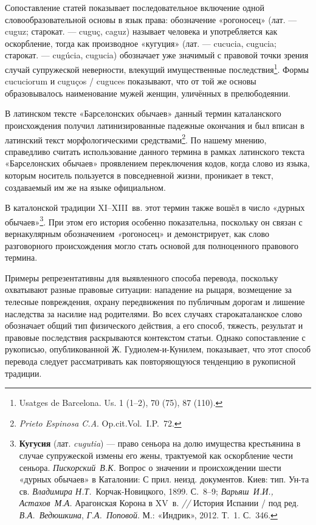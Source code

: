 Сопоставление статей показывает последовательное включение одной словообразовательной основы в язык права: обозначение «рогоносец» (лат. --- cuguz; старокат. --- cuguç, caguz) называет человека и употребляется как оскорбление, тогда как производное «кугуция» (лат. --- cucucia, cugucia; старокат. --- cugúcia, cugucia) обозначает уже значимый с правовой точки зрения случай супружеской неверности, влекущий имущественные последствия\footnote{Usatges de Barcelona. Us. 1 (1--2), 70 (75), 87 (110).}. Формы cucuciorum и cuguços / cuguces показывают, что от той же основы образовывалось наименование мужей женщин, уличённых в прелюбодеянии.

В латинском тексте «Барселонских обычаев» данный термин каталанского происхождения получил латинизированные падежные окончания и был вписан в латинский текст морфологическими средствами\footnote{\emph{Prieto Espinosa C.A}. Op.cit.Vol.~I.P.~72.}. По нашему мнению, справедливо считать использование данного термина в рамках латинского текста «Барселонских обычаев» проявлением переключения кодов, когда слово из языка, которым носитель пользуется в повседневной жизни, проникает в текст, создаваемый им же на языке официальном.

В каталонской традиции XI--XIII~вв. этот термин также вошёл в число «дурных обычаев»\footnote{\textbf{Кугусия} (лат. \emph{cugutia}) --- право сеньора на долю имущества крестьянина в случае супружеской измены его жены, трактуемой как оскорбление чести сеньора. \emph{Пискорский~В.К.} Вопрос о значении и происхождении шести «дурных обычаев» в Каталонии: С прил. неизд. документов. Киев: тип. Ун-та св. \emph{Владимира Н.Т.}~Корчак-Новицкого, 1899. С.~8--9; \emph{Варьяш~И.И., Астахов~М.А.} Арагонская Корона в XV~в. \emph{// }История Испании / под ред. \emph{В.А.~Ведюшкина}, \emph{Г.А.~Поповой}. М.: «Индрик», 2012. Т.~1. С.~346.}. При этом его история особенно показательна, поскольку он связан с вернакулярным обозначением \emph{«}рогоносец» и демонстрирует, как слово разговорного происхождения могло стать основой для полноценного правового термина.

Примеры репрезентативны для выявленного способа перевода, поскольку охватывают разные правовые ситуации: нападение на рыцаря, возмещение за телесные повреждения, охрану передвижения по публичным дорогам и лишение наследства за насилие над родителями. Во всех случаях старокаталанское слово обозначает общий тип физического действия, а его способ, тяжесть, результат и правовые последствия раскрываются контекстом статьи. Однако сопоставление с рукописью, опубликованной Ж. Гудиолем-и-Кунилем, показывает, что этот способ перевода следует рассматривать как повторяющуюся тенденцию в рукописной традиции.

